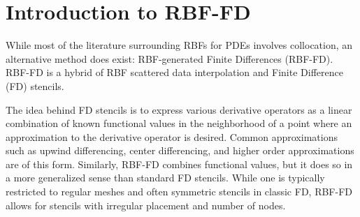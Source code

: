 \documentclass[11pt]{report}
\begin{document}
{\chapter{Introduction to RBF-FD}
\label{chap:rbffd_method}

While most of the literature surrounding RBFs for PDEs involves collocation, an alternative method does exist: RBF-generated Finite Differences (RBF-FD). RBF-FD is a hybrid of RBF scattered data interpolation and Finite Difference (FD) stencils. 

The idea behind FD stencils is to express various derivative operators as a linear combination of known functional values in the neighborhood of a point where an approximation to the derivative operator is desired. Common approximations such as upwind differencing, center differencing, and higher order approximations are of this form. 
Similarly, RBF-FD combines functional values, but it does so in a more generalized sense than standard FD stencils. While one is typically restricted to regular meshes and often symmetric stencils in classic FD, RBF-FD allows for stencils with irregular placement and number of nodes. 







}
\end{document}
